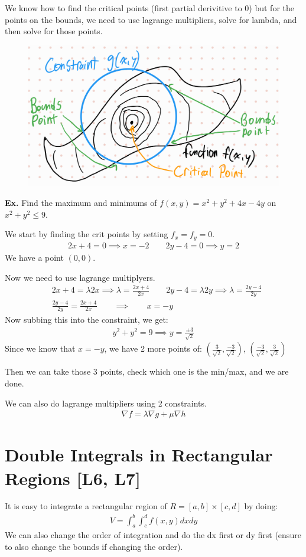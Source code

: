 \documentclass[12pt,letterpaper]{article} \usepackage{amsmath} \usepackage{graphicx} \usepackage[margin=1in]{geometry} \usepackage{longtable}  \usepackage{amssymb}
\begin{document}
	We know how to find the critical points (first partial derivitive to 0) but for the points on the bounds, we need to use lagrange multipliers, solve for lambda, and then solve for those points. 
	\begin{figure}[H]
		\centering
		\includegraphics[width=0.5\linewidth]{lagrange.png}
	\end{figure}

	\begin{mdframed}[]
		\textbf{Ex. } Find the maximum and minimums of $f(x,y) = x^2+y^2 +4x-4y$ on $x^2+y^2\le 9$.
		
		We start by finding the crit points by setting $f_x=f_y=0$.
		\begin{align*}
			2x+4=0 \implies x=-2 \qquad 2y-4 = 0 \implies y=2
		\end{align*}
		We have a point $(0,0)$.
		
		Now we need to use lagrange multiplyers. 
		\begin{align*}
			& 2x+4 = \lambda 2x \implies \lambda = \frac{2x+4}{2x} \qquad 2y-4 = \lambda 2y \implies \lambda = \frac{2y-4}{2y}\\
			& \frac{2y-4}{2y} = \frac{2x+4}{2x} \qquad \implies \qquad x=-y
		\end{align*}
		Now subbing this into the constraint, we get:
		\begin{align*}
			y^2 + y^2 = 9 \implies y=\frac{\pm 3}{\sqrt{2}}
		\end{align*}
		Since we know that $x=-y$, we have 2 more points of: $\left(\frac{3}{\sqrt{2}},\frac{-3}{\sqrt{2}}\right)$, $\left(\frac{-3}{\sqrt{2}},\frac{3}{\sqrt{2}}\right)$
		
		Then we can take those 3 points, check which one is the min/max, and we are done.
	\end{mdframed}

	We can also do lagrange multipliers using 2 constraints.
	\begin{align*}
		\nabla f = \lambda \nabla g + \mu \nabla h
	\end{align*}
	
	\section{Double Integrals in Rectangular Regions [L6, L7]}
	It is easy to integrate a rectangular region of $R = [a,b] \times [c,d]$ by doing:
	\begin{align*}
		V = \int^b_a \int^d_c f(x,y) dxdy
	\end{align*}
	We can also change the order of integration and do the dx first or dy first (ensure to also change the bounds if changing the order).
	
\end{document}
